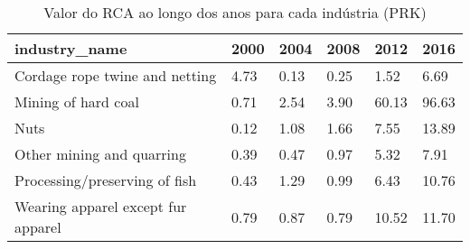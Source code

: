 \begin{table}
\centering
\caption{Valor do RCA ao longo dos anos para cada indústria (PRK)}
\begin{tabular}{p{6cm}p{1.5cm}p{1.5cm}p{1.5cm}p{1.5cm}p{1.5cm}}
\toprule
                     industry\_name & 2000 & 2004 & 2008 &  2012 &  2016 \\
\midrule
    Cordage rope twine and netting & 4.73 & 0.13 & 0.25 &  1.52 &  6.69 \\
               Mining of hard coal & 0.71 & 2.54 & 3.90 & 60.13 & 96.63 \\
                              Nuts & 0.12 & 1.08 & 1.66 &  7.55 & 13.89 \\
         Other mining and quarring & 0.39 & 0.47 & 0.97 &  5.32 &  7.91 \\
     Processing/preserving of fish & 0.43 & 1.29 & 0.99 &  6.43 & 10.76 \\
Wearing apparel except fur apparel & 0.79 & 0.87 & 0.79 & 10.52 & 11.70 \\
\bottomrule
\end{tabular}
\end{table}
